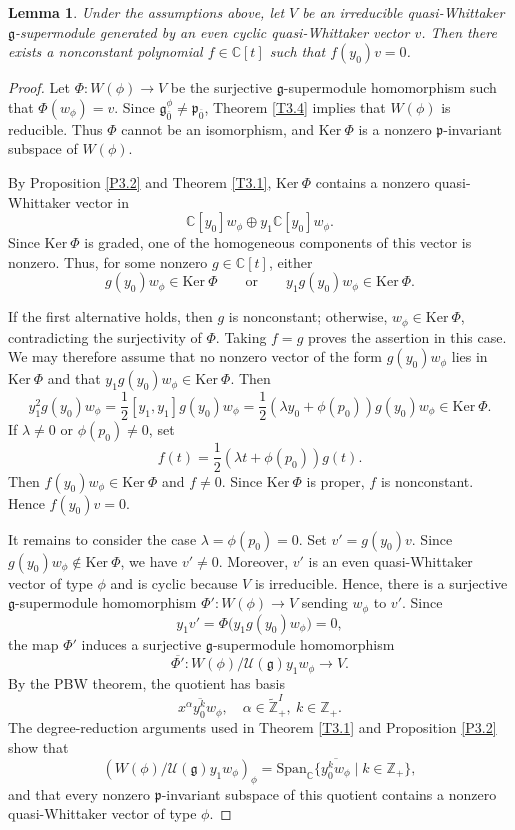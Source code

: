 \documentclass[12pt,reqno]{article}
\newtheorem{lem}[thm]{Lemma}
\def\o{\overline}
\def\a{\alpha}
\def\la{\lambda}
\def\F{\mathfrak}
\def\r{\mathrm}
\def\C{\mathcal}
\def\CC{\mathbb{C}}
\def\ZZ{\mathbb{Z}}
\def\beqn{\begin{equation*}}
\def\eeqn{\end{equation*}}
\def\({\left(}
\def\){\right)}
\begin{document}
\begin{lem}\label{L3.8}
Under the assumptions above, let $V$ be an irreducible quasi-Whittaker $\F{g}$-supermodule generated by an even cyclic quasi-Whittaker vector $v$. Then there exists a nonconstant polynomial $f\in\CC[t]$ such that $f(y_0)v=0$.
\end{lem}

\begin{proof}
Let $\Phi\colon W(\phi)\rightarrow V$ be the surjective $\F{g}$-supermodule homomorphism such that $\Phi(w_\phi)=v$. Since $\F{g}^\phi_{\o{0}}\neq\F{p}_{\o{0}}$, Theorem \ref{T3.4} implies that $W(\phi)$ is reducible. Thus $\Phi$ cannot be an isomorphism, and $\r{Ker}~\Phi$ is a nonzero $\F{p}$-invariant subspace of $W(\phi)$.

By Proposition \ref{P3.2} and Theorem \ref{T3.1}, $\r{Ker}~\Phi$ contains a nonzero quasi-Whittaker vector in
\beqn
\CC[y_0]w_\phi\oplus y_1\CC[y_0]w_\phi.
\eeqn
Since $\r{Ker}~\Phi$ is graded, one of the homogeneous components of this vector is nonzero. Thus, for some nonzero $g\in\CC[t]$, either
\beqn
g(y_0)w_\phi\in\r{Ker}~\Phi
\qquad\text{or}\qquad
y_1g(y_0)w_\phi\in\r{Ker}~\Phi.
\eeqn

If the first alternative holds, then $g$ is nonconstant; otherwise, $w_\phi\in\r{Ker}~\Phi$, contradicting the surjectivity of $\Phi$. Taking $f=g$ proves the assertion in this case. We may therefore assume that no nonzero vector of the form $g(y_0)w_\phi$ lies in $\r{Ker}~\Phi$ and that $y_1g(y_0)w_\phi\in\r{Ker}~\Phi$. Then
\beqn
y_1^2g(y_0)w_\phi=\frac{1}{2}[y_1,y_1]g(y_0)w_\phi
=\frac{1}{2}\(\la y_0+\phi(p_0)\)g(y_0)w_\phi\in\r{Ker}~\Phi.
\eeqn
If $\la\neq0$ or $\phi(p_0)\neq0$, set
\beqn
f(t)=\frac{1}{2}\(\la t+\phi(p_0)\)g(t).
\eeqn
Then $f(y_0)w_\phi\in\r{Ker}~\Phi$ and $f\neq0$. Since $\r{Ker}~\Phi$ is proper, $f$ is nonconstant. Hence $f(y_0)v=0$.

It remains to consider the case $\la=\phi(p_0)=0$. Set $v'=g(y_0)v$. Since $g(y_0)w_\phi\notin\r{Ker}~\Phi$, we have $v'\neq0$. Moreover, $v'$ is an even quasi-Whittaker vector of type $\phi$ and is cyclic because $V$ is irreducible. Hence, there is a surjective $\F{g}$-supermodule homomorphism $\Phi'\colon W(\phi)\rightarrow V$ sending $w_\phi$ to $v'$. Since
\beqn
y_1v'=\Phi\bigl(y_1g(y_0)w_\phi\bigr)=0,
\eeqn
the map $\Phi'$ induces a surjective $\F{g}$-supermodule homomorphism
\beqn
\o{\Phi'}\colon W(\phi)/\C{U}(\F{g})y_1w_\phi\rightarrow V.
\eeqn
By the PBW theorem, the quotient has basis
\beqn
\o{x^\a y_0^k w_\phi},\quad \a\in\widetilde{\ZZ}_+^I,~k\in\ZZ_+.
\eeqn
The degree-reduction arguments used in Theorem \ref{T3.1} and Proposition \ref{P3.2} show that
\beqn
\(W(\phi)/\C{U}(\F{g})y_1w_\phi\)_\phi
=\r{Span}_\CC\{\o{y_0^kw_\phi}\mid k\in\ZZ_+\},
\eeqn
and that every nonzero $\F{p}$-invariant subspace of this quotient contains a nonzero quasi-Whittaker vector of type $\phi$.


\end{proof}
\end{document}
